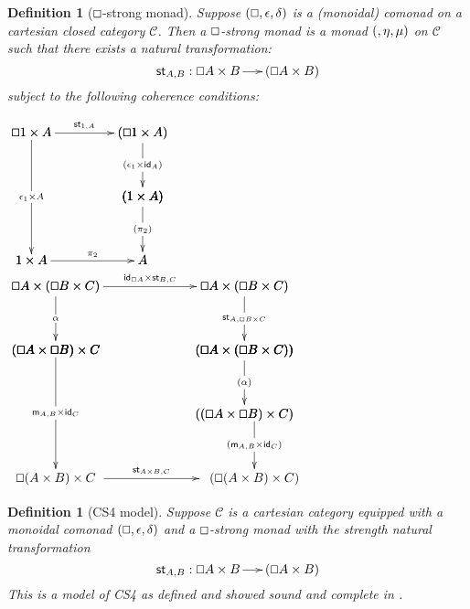 \documentclass{article}
\let\Diamond\relax
\renewcommand{\Box}{\oblong}
\newcommand{\cat}[1]{\mathcal{#1}}
\newcommand{\pd}[0]{\times}
\newcommand{\st}[2]{\mathsf{st}_{#1,#2}}
\newcommand{\id}[0]{\mathsf{id}}
\newcommand{\m}[1]{\mathsf{m}_{#1}}
\newtheorem{definition}[theorem]{Definition}
\begin{document}
\begin{definition}[$\Box$-strong monad]
  \label{def:comonad-strong-monad}
  Suppose $(\Box, \epsilon, \delta)$ is a (monoidal) comonad on a
  cartesian closed category $\cat{C}$.  Then a \emph{$\Box$-strong
    monad} is a monad $(\Diamond,\eta,\mu)$ on $\cat{C}$ such that
  there exists a natural transformation:
  \[
  \st{A}{B} : \Box A \pd \Diamond B \to \Diamond(\Box A \pd B)
  \]
  subject to the following coherence conditions:
  \begin{center}
    \begin{math}      
      \bfig
        \vSquares|ammmmma|/>``>```>`>/[\Box 1 \times \Diamond A`\Diamond (\Box 1 \times A)``\Diamond(1 \times A)`1 \times \Diamond A`\Diamond A;\st{1}{A}``\Diamond(\epsilon_1 \times \id_A)```\Diamond(\pi_2)`\pi_2]
        \morphism(0,1000)|m|/->/<0,-950>[`;\epsilon_1 \times \Diamond A]
        \efig
    \end{math}
    \\
    \begin{math}
        \bfig
        \vSquares|ammmmmm|/->`->`->```->`/[
          \Box A \times (\Box B \times \Diamond C)`
          \Box A \times \Diamond(\Box B \times C)`
          (\Box A \times \Box B) \times \Diamond C`
          \Diamond(\Box A \times (\Box B \times C))``
          \Diamond((\Box A \times \Box B) \times C);
          \id_{\Box A} \pd \st{B}{C}`
          \alpha`
          \st{A}{\Box B \times C}```
          \Diamond(\alpha)`]
        \morphism(1554,0)|m|/->/<0,-500>[`\Diamond(\Box(A \times B) \times C);\Diamond(\m{A,B} \times \id_C)]
        
        \morphism(0,500)|m|/->/<0,-1000>[`\Box(A \times B) \times \Diamond C;\m{A,B} \times \id_{\Diamond C}]

        \morphism(350,-500)|a|/->/<800,0>[`;\st{A \times B}{C}]
        \efig
    \end{math}
  \end{center}
\end{definition}

\begin{definition}[CS4 model]
  \label{def:comonad-strong-monad}
  Suppose $\cat{C}$ is a cartesian category equipped with  a monoidal comonad $(\Box, \epsilon, \delta)$ and a
  \emph{$\Box$-strong monad} with the strength natural transformation
  \[
  \st{A}{B} : \Box A \pd \Diamond B \to \Diamond(\Box A \pd B)
  \]
  This is a model of CS4 as defined and showed sound and complete in \cite{CS4}.
\end{definition}
\end{document}
